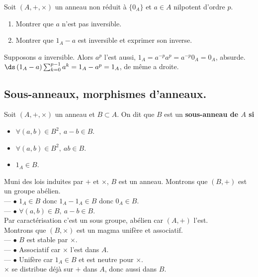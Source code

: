 \documentclass[11pt]{article}
\begin{document}
\begin{ex}{}{}
    Soit $(A,+,\times)$ un anneau non réduit à $\{0_A\}$ et $a\in A$ nilpotent d'ordre $p$.
    \begin{enumerate}
        \item Montrer que $a$ n'est pas inversible.
        \item Montrer que $1_A-a$ est inversible et exprimer son inverse.
    \end{enumerate}
    \tcblower
     Supposons $a$ inversible. Alors $a^p$ l'est aussi, $1_A=a^{-p}a^p=a^{-p}0_A=0_A$, absurde.\\
     $\ds\left( 1_A-a \right)\sum_{k=0}^{p-1}a^k=1_A-a^p=1_A$, de même a droite.
\end{ex}

\subsection{Sous-anneaux, morphismes d'anneaux.}

\begin{prop}{}{}
    Soit $(A,+,\times)$ un anneau et $B\subset A$. On dit que $B$ est un \bf{sous-anneau} de $A$ si
    \begin{itemize}
        \item $\forall (a,b)\in B^2, ~ a-b\in B$.
        \item $\forall (a,b)\in B^2, ~ ab \in B$.
        \item $1_A\in B$.
    \end{itemize}
    Muni des lois induites par $+$ et $\times$, $B$ est un anneau.
    \tcblower
    Montrons que $(B,+)$ est un groupe abélien.\\
    --- $\bullet$ $1_A\in B$ donc $1_A-1_A\in B$ donc $0_A\in B$.\\
    --- $\bullet$ $\forall (a,b)\in B, ~ a-b \in B$.\\
    Par caractérisation c'est un sous groupe, abélien car $(A,+)$ l'est.\\
    Montrons que $(B,\times)$ est un magma unifère et associatif.\\
    --- $\bullet$ $B$ est stable par $\times$.\\
    --- $\bullet$ Associatif car $\times$ l'est dans $A$.\\
    --- $\bullet$ Unifère car $1_A\in B$ et est neutre pour $\times$.\\
    $\times$ se distribue déjà sur $+$ dans $A$, donc aussi dans $B$.
\end{prop}
\end{document}
